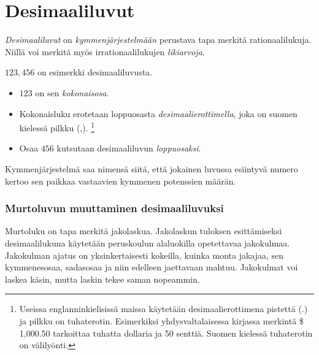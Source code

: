 \chapter{Desimaaliluvut}

\emph{Desimaaliluvut} on \emph{kymmenjärjestelmään} perustava tapa merkitä rationaalilukuja. Niillä voi merkitä myös irrationaalilukujen \emph{likiarvoja}.

$123,456$ on esimerkki desimaaliluvusta.

\begin{itemize}
	\item $123$ on sen \emph{kokonaisosa}.
	\item Kokonaisluku erotetaan loppuosasta \emph{desimaalierottimella}, joka on suomen kielessä pilkku (,).
	\footnote{Useissa englanninkielisissä maissa käytetään desimaalierottimena pistettä (.) ja pilkku on tuhaterotin. Esimerkiksi yhdysvaltalaisessa kirjassa merkintä \$ 1,000.50 tarkoittaa tuhatta dollaria ja 50 senttiä. Suomen kielessä tuhaterotin on välilyönti.}
	\item Osaa $456$ kutsutaan desimaaliluvun \emph{loppuosaksi}.
\end{itemize}


Kymmenjärjestelmä saa nimensä siitä, että jokainen luvussa esiintyvä numero kertoo sen paikkaa vastaavien kymmenen potenssien määrän.

\subsection*{Murtoluvun muuttaminen desimaaliluvuksi}

Murtoluku on tapa merkitä jakolaskua. Jakolaskun tuloksen esittämiseksi desimaalilukuna
käytetään peruskoulun alaluokilla opetettavaa jakokulmaa. Jakokulman ajatus on yksinkertaisesti kokeilla, kuinka monta jakajaa, sen kymmenesosaa, sadasosaa ja niin
edelleen jaettavaan mahtuu. Jakokulmat voi laskea käsin, mutta laskin tekee saman nopeammin.

